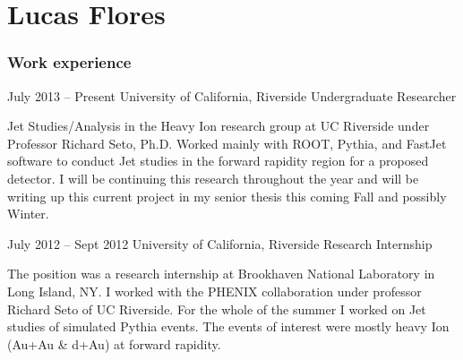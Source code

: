 \documentclass[15pt]{tccv}
\begin{document}
\part{Lucas Flores}

\section{Work experience} 

\begin{eventlist}

\item{July 2013 -- Present} 
     {University of California, Riverside}
     {Undergraduate Researcher } 

Jet Studies/Analysis in the Heavy Ion research group at UC Riverside under Professor Richard Seto, Ph.D. Worked mainly with ROOT, Pythia, and FastJet software to conduct Jet studies in the forward rapidity region for a proposed detector. I will be continuing this research throughout the year and will be writing up this current project in my senior thesis this coming Fall and possibly Winter. \\

\item{July 2012 -- Sept 2012}
     {University of California, Riverside}
     {Research Internship} 
     
The position was a research internship at Brookhaven National Laboratory in Long Island, NY. I worked with the PHENIX collaboration under professor Richard Seto of UC Riverside. For the whole of the summer I worked on Jet studies of simulated Pythia events. The events of interest were mostly heavy Ion (Au+Au \& d+Au) at forward rapidity. 
     

\end{eventlist} 
    
    
    
    
    
\end{document}
